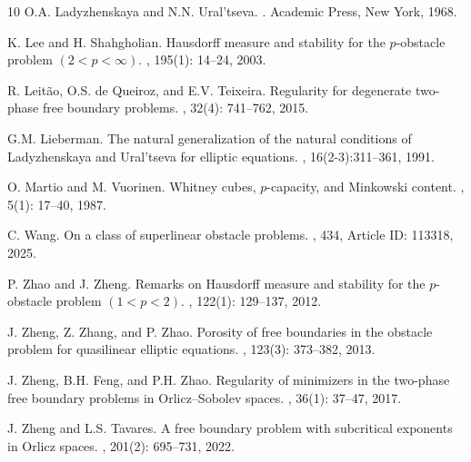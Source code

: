 \documentclass[onecolumn]{autart}
\begin{document}
\begin{thebibliography}{10}
O.A. Ladyzhenskaya and N.N. Ural'tseva.
.
\newblock Academic Press, New York, 1968.

K. Lee and H. Shahgholian.
\newblock Hausdorff measure and stability for the $p$-obstacle problem $(2 < p < \infty)$.
, 195(1): 14--24, 2003.

R. Leit\~ao, O.S. de Queiroz, and E.V. Teixeira.
\newblock Regularity for degenerate two-phase free boundary problems.
, 32(4): 741--762, 2015.

G.M. Lieberman.
\newblock The natural generalization of the natural conditions of Ladyzhenskaya and Ural'tseva for elliptic equations.
, 16(2-3):311--361, 1991.

O. Martio and M. Vuorinen.
\newblock Whitney cubes, $p$-capacity, and Minkowski content.
, 5(1): 17--40, 1987.

C. Wang.
\newblock On a class of superlinear obstacle problems.
, 434, Article ID: 113318, 2025.

P. Zhao and J. Zheng.
\newblock Remarks on Hausdorff measure and stability for the $p$-obstacle problem $(1 < p < 2)$.
, 122(1): 129--137, 2012.

J. Zheng, Z. Zhang, and P. Zhao.
\newblock Porosity of free boundaries in the obstacle problem for quasilinear elliptic equations.
, 123(3): 373--382, 2013.

J. Zheng, B.H. Feng, and P.H. Zhao.
\newblock Regularity of minimizers in the two-phase free boundary problems in Orlicz--Sobolev spaces.
, 36(1): 37--47, 2017.

J. Zheng and L.S. Tavares.
\newblock A free boundary problem with subcritical exponents in Orlicz spaces.
, 201(2): 695--731, 2022.
\end{thebibliography}

\end{document}
